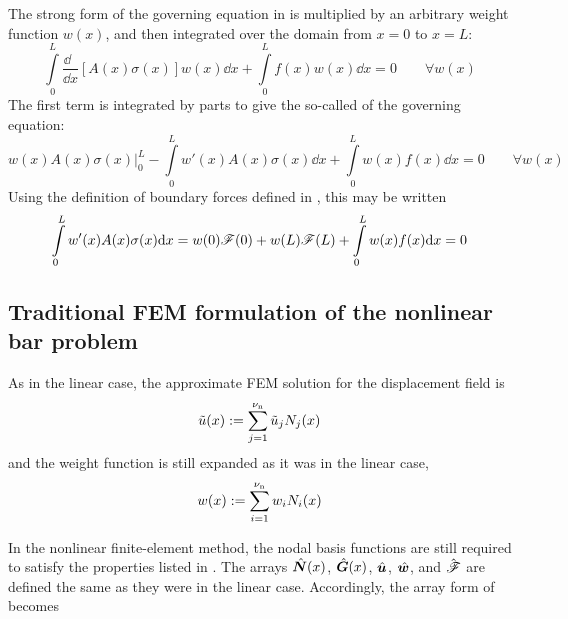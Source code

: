 The strong form of the governing equation in  is multiplied by an arbitrary weight function  $w(x)$, and then integrated over the domain from $x=0$ to $x=L$:
\begin{equation}
  \int\limits_0^L \frac{\dd~~}{\dd x}\left[A(x) \sigma(x)\right] w(x)\dd x  +  \int\limits_0^L f(x)w(x)\dd x=0
\qquad\forall w(x)
\end{equation}
The first term is integrated by parts to give the so-called  of the governing equation:
\begin{equation}
  w(x) A(x) \sigma(x) \big|_0^L-\int\limits_0^L w'(x) A(x) \sigma(x)\dd x  +  \int\limits_0^L w(x)f(x)\dd x=0
\qquad\forall w(x)
\label{eq:nonLinearBarWeakForm}
\end{equation}
Using the definition of boundary forces defined in , this may be written
\begin{equation}
 \int\limits_0^L w'(x)A(x) \sigma(x) \mathrm{d} x = w(0)\mathscr{F}(0)+w(L)\mathscr{F}(L)  +  \int\limits_0^L w(x)f(x)\mathrm{d} x=0
\label{eq:nonLinearBarWeakFormWithForcesc}
\end{equation}




\subsection{Traditional FEM formulation of the nonlinear bar problem}
\label{sec:nonLinearBarFEM}
As in the linear case, the approximate FEM solution for the displacement field is
\begin{equation}
  \tilde{u}(x):=\sum\limits_{j=1}^{{\nu_\text{n}}}\tilde{u}_j {N}_j(x)
\label{eq:nonLinaprxuc}
\end{equation}
and the weight function is still expanded as it was in the linear case,
\begin{equation}
  w(x):=\sum\limits_{i=1}^{{\nu_\text{n}}}w_i {N}_i(x)
\label{eq:nonLinweightc}
\end{equation}

In the nonlinear finite-element method, the nodal basis functions are still required to satisfy the properties listed in . The arrays $\hat{\bm{N}}(x)$, $\hat{\bm{G}}(x)$, $\hat{\bm{u}}$, $\hat{\bm{w}}$, and $\hat{\bm{\mathscr{F}}}$ are defined the same as they were in the linear case. Accordingly, the array form of  becomes

